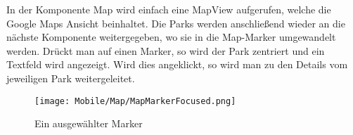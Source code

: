 In der Komponente Map wird einfach eine MapView aufgerufen, welche die Google Maps Ansicht
beinhaltet. Die Parks werden anschließend wieder an die nächste Komponente weitergegeben, wo sie in
die Map-Marker umgewandelt werden. Drückt man auf einen Marker, so wird der Park zentriert und ein
Textfeld wird angezeigt. Wird dies angeklickt, so wird man zu den Details vom jeweiligen Park
weitergeleitet.

\begin{figure}[H]
  \begin{center}
    \texttt{[image: Mobile/Map/MapMarkerFocused.png]}
    \caption{Ein ausgewählter Marker}
  \end{center}
\end{figure}
